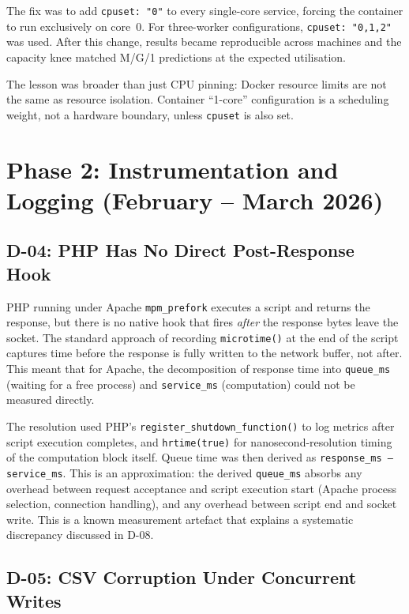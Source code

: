 The fix was to add \texttt{cpuset: "0"} to every single-core service, forcing the container to run exclusively on core~0. For three-worker configurations, \texttt{cpuset: "0,1,2"} was used. After this change, results became reproducible across machines and the capacity knee matched M/G/1 predictions at the expected utilisation.

The lesson was broader than just CPU pinning: Docker resource limits are not the same as resource isolation. Container ``1-core'' configuration is a scheduling weight, not a hardware boundary, unless \texttt{cpuset} is also set.

\section{Phase 2: Instrumentation and Logging (February -- March 2026)}
\label{sec:journey-phase2}

\subsection{D-04: PHP Has No Direct Post-Response Hook}

PHP running under Apache \texttt{mpm\_prefork} executes a script and returns the response, but there is no native hook that fires \emph{after} the response bytes leave the socket. The standard approach of recording \texttt{microtime()} at the end of the script captures time before the response is fully written to the network buffer, not after. This meant that for Apache, the decomposition of response time into \texttt{queue\_ms} (waiting for a free process) and \texttt{service\_ms} (computation) could not be measured directly.

The resolution used PHP's \texttt{register\_shutdown\_function()} to log metrics after script execution completes, and \texttt{hrtime(true)} for nanosecond-resolution timing of the computation block itself. Queue time was then derived as \texttt{response\_ms\,--\,service\_ms}. This is an approximation: the derived \texttt{queue\_ms} absorbs any overhead between request acceptance and script execution start (Apache process selection, connection handling), and any overhead between script end and socket write. This is a known measurement artefact that explains a systematic discrepancy discussed in D-08.

\subsection{D-05: CSV Corruption Under Concurrent Writes}

